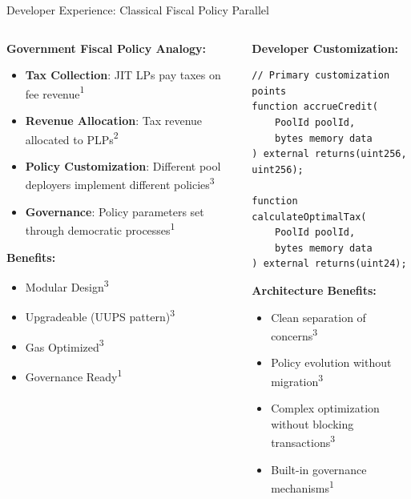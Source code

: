 \documentclass[aspectratio=169]{beamer}
\newcommand{\citeaquilina}{\textcolor{parityblue}{\textsuperscript{1}}}
\newcommand{\citecapponi}{\textcolor{paritygreen}{\textsuperscript{2}}}
\newcommand{\citema}{\textcolor{parityorange}{\textsuperscript{3}}}
\begin{document}
\begin{frame}{Developer Experience: Classical Fiscal Policy Parallel}
    \begin{columns}
        \begin{column}{0.5\textwidth}
            \textbf{Government Fiscal Policy Analogy:}
            \begin{itemize}
                \item \textcolor{parityblue}{\textbf{Tax Collection}}: JIT LPs pay taxes on fee revenue\citeaquilina
                \item \textcolor{parityblue}{\textbf{Revenue Allocation}}: Tax revenue allocated to PLPs\citecapponi
                \item \textcolor{parityblue}{\textbf{Policy Customization}}: Different pool deployers implement different policies\citema
                \item \textcolor{parityblue}{\textbf{Governance}}: Policy parameters set through democratic processes\citeaquilina
            \end{itemize}
            
            \vspace{0.5cm}
            \textbf{Benefits:}
            \begin{itemize}
                \item Modular Design\citema
                \item Upgradeable (UUPS pattern)\citema
                \item Gas Optimized\citema
                \item Governance Ready\citeaquilina
            \end{itemize}
        \end{column}
        \begin{column}{0.5\textwidth}
            \textbf{Developer Customization:}
            \begin{lstlisting}[language=Solidity]
// Primary customization points
function accrueCredit(
    PoolId poolId, 
    bytes memory data
) external returns(uint256, uint256);

function calculateOptimalTax(
    PoolId poolId, 
    bytes memory data
) external returns(uint24);
            \end{lstlisting}
            
            \vspace{0.5cm}
            \textbf{Architecture Benefits:}
            \begin{itemize}
                \item Clean separation of concerns\citema
                \item Policy evolution without migration\citema
                \item Complex optimization without blocking transactions\citema
                \item Built-in governance mechanisms\citeaquilina
            \end{itemize}
        \end{column}
    \end{columns}
\end{frame}
\end{document}
